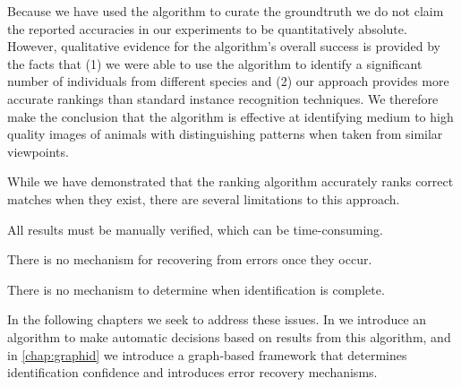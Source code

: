     Because we have used the algorithm to curate the groundtruth we do not claim the reported accuracies in our
    experiments to be quantitatively absolute. However, qualitative evidence for the algorithm's overall success is
    provided by the facts that (1) we were able to use the algorithm to identify a significant number of
    individuals from different species and (2) our approach provides more accurate rankings than standard instance
    recognition techniques. We therefore make the conclusion that the algorithm is effective at identifying medium
    to high quality images of animals with distinguishing patterns when taken from similar viewpoints.

    While we have demonstrated that the ranking algorithm accurately ranks correct matches when they exist, there
      are several limitations to this approach.
    \begin{enumln}
        \item All results must be manually verified, which can be time-consuming.
        \item There is no mechanism for recovering from errors once they occur.
        \item There is no mechanism to determine when identification is complete.
    \end{enumln}
    In the following chapters we seek to address these issues.
    In  we introduce an algorithm to make automatic decisions based on results from this
      algorithm, and in \cref{chap:graphid} we introduce a graph-based framework that determines identification
      confidence and introduces error recovery mechanisms.
